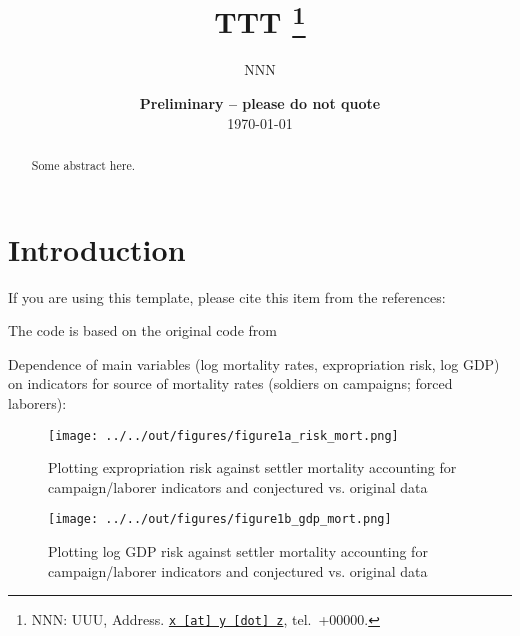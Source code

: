 \documentclass[11pt, a4paper, leqno]{article}
\begin{document}
\title{TTT
\thanks{NNN: UUU, Address. \href{mailto:x@y.z} {\nolinkurl{x [at] y [dot] z}}, tel.~+00000.}
}

\author{NNN
}

\date{
{\bf Preliminary -- please do not quote} 
\\[1ex] 
\today
}

\maketitle


\begin{abstract}
	Some abstract here.
\end{abstract}
\clearpage

\section{Introduction} %
\label{sec:introduction}

If you are using this template, please cite this item from the references: \citet{Gaudecker13}

The code is based on the original code from \citet{Albouy2012}

Dependence of main variables (log mortality rates, expropriation risk, log GDP) on indicators for source of mortality rates (soldiers on campaigns; forced laborers):
	
\clearpage


\begin{figure}
    \caption{Plotting expropriation risk against settler mortality accounting for campaign/laborer indicators and conjectured vs. original data}    
	\texttt{[image: ../../out/figures/figure1a\_risk\_mort.png]}
\end{figure}


\begin{figure}
    \caption{Plotting log GDP risk against settler mortality accounting for campaign/laborer indicators and conjectured vs. original data}    
	\texttt{[image: ../../out/figures/figure1b\_gdp\_mort.png]}
\end{figure}

\clearpage






\printbibliography

\end{document}
